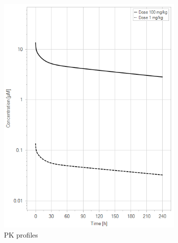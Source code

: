 \documentclass[fleqn,10pt]{physiome}
\begin{document}
\begin{figure}[htb]\centering
    \begin{subfigure}{0.49\textwidth}
        \includegraphics[width=\textwidth]{pl4.png}
        \caption{PK profiles}
        \label{fig:3a}
    \end{subfigure}
    \hfill
    \begin{subfigure}{0.49\textwidth}

\end{subfigure}
\end{figure}
\end{document}
